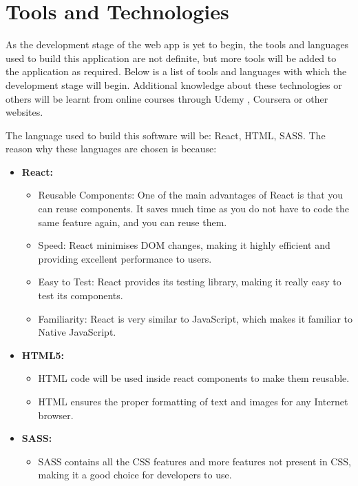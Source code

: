 \section{Tools and Technologies}
As the development stage of the web app is yet to begin, the tools and languages used to build this application are not definite, but more tools will be added to the application as required. Below is a list of tools and languages with which the development stage will begin. Additional knowledge about these technologies or others will be learnt from online courses through Udemy \parencite{Reference25}, Coursera \parencite{Reference26} or other websites. 

The language used to build this software will be: React, HTML, SASS. The reason why these languages are chosen is because:

\begin{itemize}
    \item \textbf{React:} \parencite{Reference20}
    \begin{itemize}
        \item Reusable Components: One of the main advantages of React is that you can reuse components. It saves much time as you do not have to code the same feature again, and you can reuse them.
        \item Speed: React minimises DOM changes, making it highly efficient and providing excellent performance to users.
        \item Easy to Test: React provides its testing library, making it really easy to test its components.
        \item Familiarity: React is very similar to JavaScript, which makes it familiar to Native JavaScript.
    \end{itemize}
    \item \textbf{HTML5:} \parencite{Reference21}
    \begin{itemize}
        \item HTML code will be used inside react components to make them reusable.
        \item HTML ensures the proper formatting of text and images for any Internet browser.
    \end{itemize}
    \item \textbf{SASS:} \parencite{Reference22}
    \begin{itemize}
        \item SASS contains all the CSS features and more features not present in CSS, making it a good choice for developers to use.

\end{itemize}
\end{itemize}
